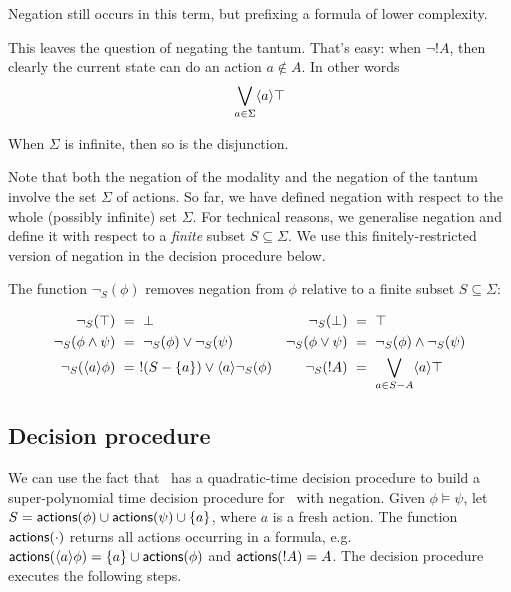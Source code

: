 \NI Negation still occurs in this term, but prefixing a formula of
lower complexity.

This leaves the question of negating the tantum. That's easy: when
$\neg !A$, then clearly the current state can do an action $a \notin
A$. In other words
\[
   \bigvee_{a \in \Sigma}\langle a \rangle \top
\]

\NI When $\Sigma$ is infinite, then so is the disjunction.

Note that both the negation of the modality and the negation of
the tantum involve the set $\Sigma$ of actions. 
So far, we have defined negation with respect to
the whole (possibly infinite) set $\Sigma$. For technical reasons, we
generalise negation and define it with respect to a \emph{finite}
subset $S \subseteq \Sigma$. We use this finitely-restricted version of
negation in the decision procedure below.

\begin{definition}
The function $\neg_{S}(\phi)$ removes negation from $\phi$
relative to a finite subset $S \subseteq \Sigma$:

\begin{align*}
  \neg_{S}(\top) &\ =\  \bot  &
  \neg_S(\bot) &\ =\  \top  \\
  \neg_S(\phi \land \psi) &\ =\  \neg_S(\phi) \lor \neg_S(\psi)  &
  \neg_S(\phi \lor \psi) &\ =\  \neg_S(\phi) \land \neg_S(\psi)  \\
  \neg_S(\langle a \rangle \phi) &\ =\  !(S-\{a\}) \lor \langle a \rangle \neg_S(\phi)  &
  \neg_S(! A) &\ =\  \bigvee_{a \in S - A} \langle a \rangle \top
\end{align*}


\end{definition}

\subsection{Decision procedure}

\NI We can use the fact that \cathoristic\ has a quadratic-time
decision procedure to build a super-polynomial time decision procedure for
\cathoristic\ with negation.  Given $\phi \models \psi$, let $S =
\mathsf{actions}(\phi) \cup \mathsf{actions}(\psi) \cup \{a\}$,   where $a$ is a
fresh action.  The function $\mathsf{actions}(\cdot)$ returns all actions
occurring in a formula, e.g.~$\mathsf{actions}(\langle a \rangle \phi) = \{a\} \cup
\mathsf{actions}(\phi)$ and $\mathsf{actions}(!A) = A$. The decision procedure executes the following steps.

